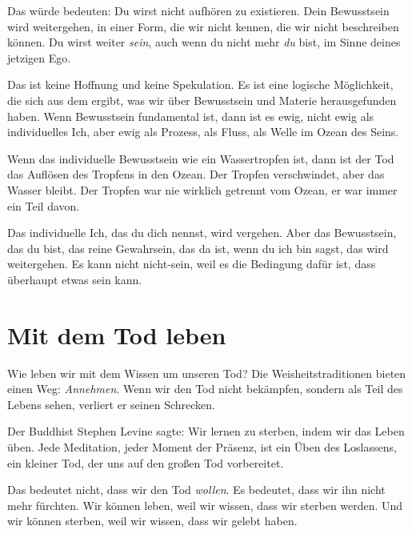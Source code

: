 Das würde bedeuten: Du wirst nicht aufhören zu existieren. Dein Bewusstsein wird weitergehen, in einer Form, die wir nicht kennen, die wir nicht beschreiben können. Du wirst weiter \emph{sein}, auch wenn du nicht mehr \emph{du} bist, im Sinne deines jetzigen Ego.

Das ist keine Hoffnung und keine Spekulation. Es ist eine logische Möglichkeit, die sich aus dem ergibt, was wir über Bewusstsein und Materie herausgefunden haben. Wenn Bewusstsein fundamental ist, dann ist es ewig, nicht ewig als individuelles Ich, aber ewig als Prozess, als Fluss, als Welle im Ozean des Seins.

\begin{bsp}
	Wenn das individuelle Bewusstsein wie ein Wassertropfen ist, dann ist der Tod das Auflösen des Tropfens in den Ozean. Der Tropfen \glqq verschwindet\grqq{}, aber das Wasser bleibt. Der Tropfen war nie wirklich getrennt vom Ozean, er war immer ein Teil davon.
\end{bsp}

Das individuelle Ich, das \glqq du\grqq{} dich nennst, wird vergehen. Aber das Bewusstsein, das du bist, das reine Gewahrsein, das da ist, wenn du \glqq ich bin\grqq{} sagst, das wird weitergehen. Es kann nicht nicht-sein, weil es die Bedingung dafür ist, dass überhaupt etwas sein kann.

\section{Mit dem Tod leben}

Wie leben wir mit dem Wissen um unseren Tod? Die Weisheitstraditionen bieten einen Weg: \emph{Annehmen}. Wenn wir den Tod nicht bekämpfen, sondern als Teil des Lebens sehen, verliert er seinen Schrecken.

Der Buddhist Stephen Levine sagte: \glqq Wir lernen zu sterben, indem wir das Leben üben.\grqq{} Jede Meditation, jeder Moment der Präsenz, ist ein Üben des Loslassens, ein kleiner Tod, der uns auf den großen Tod vorbereitet.

Das bedeutet nicht, dass wir den Tod \emph{wollen}. Es bedeutet, dass wir ihn nicht mehr fürchten. Wir können leben, weil wir wissen, dass wir sterben werden. Und wir können sterben, weil wir wissen, dass wir gelebt haben.


